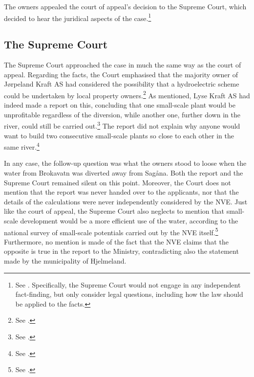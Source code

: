The owners appealed the court of appeal's decision to the Supreme Court, which decided to hear the  juridical aspects of the case.\footnote{See \cite[8]{jorpeland11}. Specifically, the Supreme Court would not engage in any independent fact-finding, but only consider legal questions, including how the law should be applied to the facts.}

\subsection{The Supreme Court}\label{sec:5:6:4}

The Supreme Court approached the case in much the same way as the court of appeal. Regarding the facts, the Court emphasised that the majority owner of Jørpeland Kraft AS had considered the possibility that a hydroelectric scheme could be undertaken by local property owners.\footnote{See \cite[53]{jorpeland11}.} As mentioned, Lyse Kraft AS had indeed made a report on this, concluding that one small-scale plant would be unprofitable regardless of the diversion, while another one, further down in the river, could still be carried out.\footnote{See \cite[23]{jorpeland09}.} The report did not explain why anyone would want to build two consecutive small-scale plants so close to each other in the same river.\footnote{See \cite[16|23]{jorpeland09}.}

In any case, the follow-up question was what the owners stood to loose when the water from Brokavatn was diverted away from Sagåna. Both the report and the Supreme Court remained silent on this point. Moreover, the Court does not mention that the report was never handed over to the applicants, nor that the details of the calculations were never independently considered by the NVE. Just like the court of appeal, the Supreme Court also neglects to mention that small-scale development would be a more efficient use of the water, according to the national survey of small-scale potentials carried out by the NVE itself.\footnote{See \cite[16]{jorpeland09}.} Furthermore, no mention is made of the fact that the NVE claims that the opposite is true in the report to the Ministry, contradicting also the statement made by the municipality of Hjelmeland.

